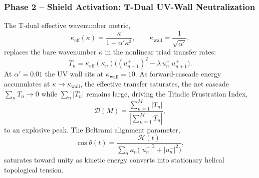 \subsubsection*{Phase 2 -- Shield Activation: T-Dual UV-Wall Neutralization}

The T-dual effective wavenumber metric,
\begin{equation}
  \kappa_{\mathrm{eff}}(\kappa) = \frac{\kappa}{1 + \alpha'\kappa^2},
  \qquad
  \kappa_{\mathrm{wall}} = \frac{1}{\sqrt{\alpha'}},
  \label{eq:k_eff}
\end{equation}
replaces the bare wavenumber $\kappa$ in the nonlinear triad transfer rates:
\begin{equation}
  T_n = \kappa_{\mathrm{eff}}(\kappa_n)
        \bigl((u_{n-1}^+)^2 - \lambda\,u_n^+\,u_{n+1}^+\bigr).
\end{equation}
At $\alpha' = 0.01$ the UV wall sits at $\kappa_{\mathrm{wall}} = 10$.
As forward-cascade energy accumulates at $\kappa \to \kappa_{\mathrm{wall}}$,
the effective transfer saturates, the net cascade $\sum_n T_n \to 0$ while
$\sum_n |T_n|$ remains large, driving the Triadic Frustration Index,
\begin{equation}
  \mathcal{D}(M) = \frac{\displaystyle\sum_{n=1}^{M}|T_n|}
                        {\!\left|\displaystyle\sum_{n=1}^{M}T_n\right|\!},
  \label{eq:frustration_index}
\end{equation}
to an explosive peak. The Beltrami alignment parameter,
\begin{equation}
  \cos\theta(t)
  = \frac{|\mathcal{H}(t)|}{\displaystyle\sum_n \kappa_n\bigl(|u_n^+|^2+|u_n^-|^2\bigr)},
  \label{eq:beltrami_cos}
\end{equation}
saturates toward unity as kinetic energy converts into stationary helical
topological tension.

